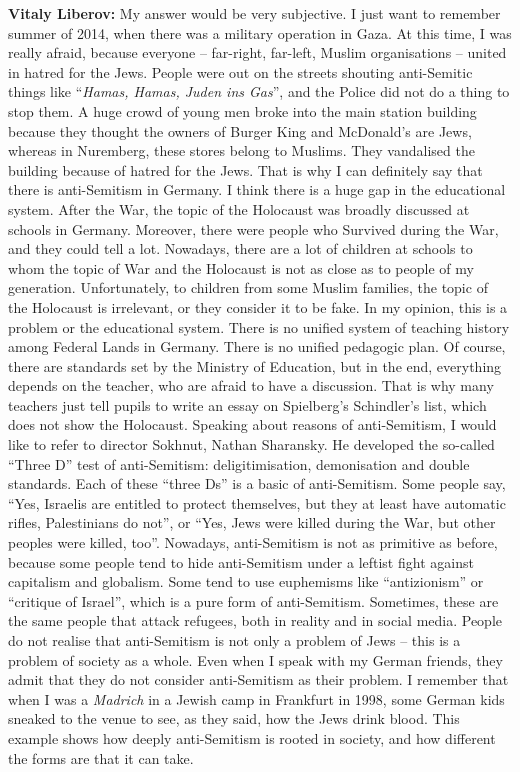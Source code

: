 \textbf{Vitaly Liberov:} My answer would be very subjective. I just want to remember summer of 2014, when there was a military operation in Gaza. At this time, I was really afraid, because everyone – far-right, far-left, Muslim organisations – united in hatred for the Jews. People were out on the streets shouting anti-Semitic things like ``\textit{Hamas, Hamas, Juden ins Gas}'', and the Police did not do a thing to stop them. A huge crowd of young men broke into the main station building because they thought the owners of Burger King and McDonald’s are Jews, whereas in Nuremberg, these stores belong to Muslims. They vandalised the building because of hatred for the Jews. That is why I can definitely say that there is anti-Semitism in Germany. I think there is a huge gap in the educational system. After the War, the topic of the Holocaust was broadly discussed at schools in Germany. Moreover, there were people who Survived during the War, and they could tell a lot. Nowadays, there are a lot of children at schools to whom the topic of War and the Holocaust is not as close as to people of my generation. Unfortunately, to children from some Muslim families, the topic of the Holocaust is irrelevant, or they consider it to be fake. In my opinion, this is a problem or the educational system. There is no unified system of teaching history among Federal Lands in Germany. There is no unified pedagogic plan. Of course, there are standards set by the Ministry of Education, but in the end, everything depends on the teacher, who are afraid to have a discussion. That is why many teachers just tell pupils to write an essay on Spielberg’s Schindler’s list, which does not show the Holocaust. Speaking about reasons of anti-Semitism, I would like to refer to director Sokhnut, Nathan Sharansky. He developed the so-called ``Three D'' test of anti-Semitism: deligitimisation, demonisation and double standards. Each of these ``three Ds'' is a basic of anti-Semitism. Some people say, ``Yes, Israelis are entitled to protect themselves, but they at least have automatic rifles, Palestinians do not'', or ``Yes, Jews were killed during the War, but other peoples were killed, too''. Nowadays, anti-Semitism is not as primitive as before, because some people tend to hide anti-Semitism under a leftist fight against capitalism and globalism. Some tend to use euphemisms like ``antizionism'' or ``critique of Israel'', which is a pure form of anti-Semitism. Sometimes, these are the same people that attack refugees, both in reality and in social media. People do not realise that anti-Semitism is not only a problem of Jews – this is a problem of society as a whole. Even when I speak with my German friends, they admit that they do not consider anti-Semitism as their problem. I remember that when I was a \textit{Madrich} in a Jewish camp in Frankfurt in 1998, some German kids sneaked to the venue to see, as they said, how the Jews drink blood. This example shows how deeply anti-Semitism is rooted in society, and how different the forms are that it can take.  

